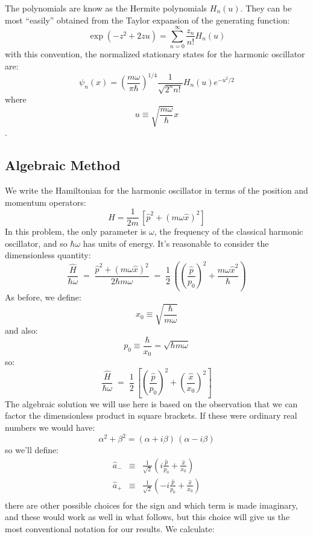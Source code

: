 \documentclass[12pt]{book}
\begin{document}
The polynomials are know as the Hermite polynomials $H_n(u)$.  They can be most ``easily'' obtained from the Taylor expansion of the generating function:
$$\exp(-z^2+2zu) = \sum_{n=0}^{\infty} \frac{z_n}{n!}H_n(u)$$
with this convention, the normalized stationary states for the harmonic oscillator are:
$$\psi_n(x) = \left( \frac{m \omega}{\pi \hbar} \right)^{1/4} \frac{1}{\sqrt{2^n n!}}H_n(u) e^{-u^2/2}$$
where
$$u \equiv \sqrt{\frac{m \omega}{\hbar}} x$$.

 
\subsection{Algebraic Method}

We write the Hamiltonian for the harmonic oscillator in terms of the position and momentum operators:
\begin{equation*}
\hat{H} = \frac{1}{2m}\,\left[ \hat{p}^2 + \left( m \omega \hat{x} \right)^2 \right]
\end{equation*}
In this problem, the only parameter is $\omega$, the frequency of the classical harmonic oscillator, and so $\hbar \omega$ has units of energy. It's reasonable to consider the dimensionless quantity:
\begin{equation*}
\frac{\hat{H}}{\hbar\omega} \; = \; \frac{\hat{p}^2 + (m \omega \hat{x})^2 }{2 \hbar m \omega }
\; = \; \frac{1}{2} \, \left( \left(\frac{\hat{p}}{p_0}\right)^2 + \frac{m \omega \hat{x}^2 }{\hbar} \right)
\end{equation*}
As before, we define:
$$x_0 \equiv \sqrt{\frac{\hbar}{m \omega}}$$
and also:
$$p_0 \equiv \frac{\hbar}{x_0} = \sqrt{\hbar m \omega}$$
so:
\begin{equation*}
\frac{\hat{H}}{\hbar\omega} \; = \; \frac{1}{2} \, \left[ \left(\frac{\hat{p}}{p_0}\right)^2 + \left( \frac{\hat{x}}{x_0}\right)^2 \right]
\end{equation*}
The algebraic solution we will use here is based on the observation that we can factor the dimensionless product in square brackets.  If these were ordinary real numbers we would have:
$$\alpha^2 + \beta^2 = (\alpha + i\beta) \, (\alpha - i\beta) $$
so we'll define:
\begin{eqnarray*}
\hat{a}_- &\equiv& \frac{1}{\sqrt{2}}\left(i \frac{\hat{p}}{p_0} + \frac{\hat{x}}{x_0}\right) \\
\hat{a}_+ &\equiv& \frac{1}{\sqrt{2}}\left(-i \frac{\hat{p}}{p_0} + \frac{\hat{x}}{x_0} \right) \\
\end{eqnarray*}
there are other possible choices for the sign and which term is made imaginary, and these would work as well in what follows, but this choice will give us the most conventional notation for our results.  We calculate:
\end{document}

